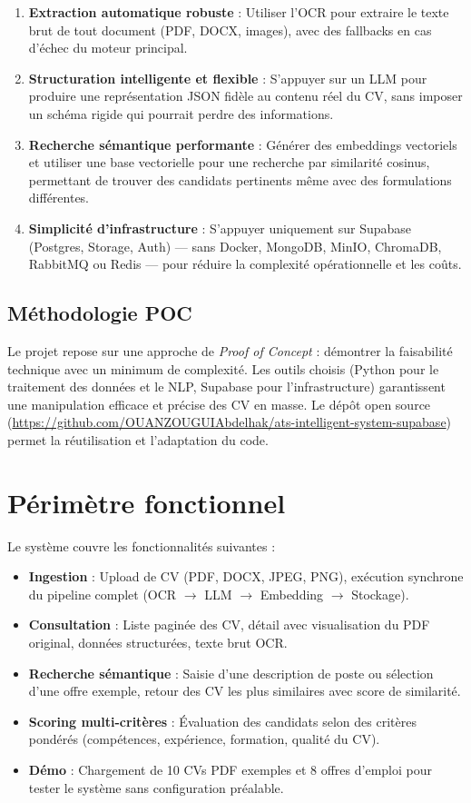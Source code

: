 \documentclass[11pt,a4paper]{report}
\begin{document}
\begin{enumerate}[leftmargin=*]
  \item \textbf{Extraction automatique robuste} : Utiliser l'OCR pour extraire le texte brut de tout document (PDF, DOCX, images), avec des fallbacks en cas d'échec du moteur principal.
  \item \textbf{Structuration intelligente et flexible} : S'appuyer sur un LLM pour produire une représentation JSON fidèle au contenu réel du CV, sans imposer un schéma rigide qui pourrait perdre des informations.
  \item \textbf{Recherche sémantique performante} : Générer des embeddings vectoriels et utiliser une base vectorielle pour une recherche par similarité cosinus, permettant de trouver des candidats pertinents même avec des formulations différentes.
  \item \textbf{Simplicité d'infrastructure} : S'appuyer uniquement sur Supabase (Postgres, Storage, Auth) — sans Docker, MongoDB, MinIO, ChromaDB, RabbitMQ ou Redis — pour réduire la complexité opérationnelle et les coûts.
\end{enumerate}

\subsection{Méthodologie POC}

Le projet repose sur une approche de \textit{Proof of Concept} : démontrer la faisabilité technique avec un minimum de complexité. Les outils choisis (Python pour le traitement des données et le NLP, Supabase pour l'infrastructure) garantissent une manipulation efficace et précise des CV en masse. Le dépôt open source (\url{https://github.com/OUANZOUGUIAbdelhak/ats-intelligent-system-supabase}) permet la réutilisation et l'adaptation du code.

\section{Périmètre fonctionnel}

Le système couvre les fonctionnalités suivantes :

\begin{itemize}[leftmargin=*]
  \item \textbf{Ingestion} : Upload de CV (PDF, DOCX, JPEG, PNG), exécution synchrone du pipeline complet (OCR $\rightarrow$ LLM $\rightarrow$ Embedding $\rightarrow$ Stockage).
  \item \textbf{Consultation} : Liste paginée des CV, détail avec visualisation du PDF original, données structurées, texte brut OCR.
  \item \textbf{Recherche sémantique} : Saisie d'une description de poste ou sélection d'une offre exemple, retour des CV les plus similaires avec score de similarité.
  \item \textbf{Scoring multi-critères} : Évaluation des candidats selon des critères pondérés (compétences, expérience, formation, qualité du CV).
  \item \textbf{Démo} : Chargement de 10 CVs PDF exemples et 8 offres d'emploi pour tester le système sans configuration préalable.
\end{itemize}
\end{document}
